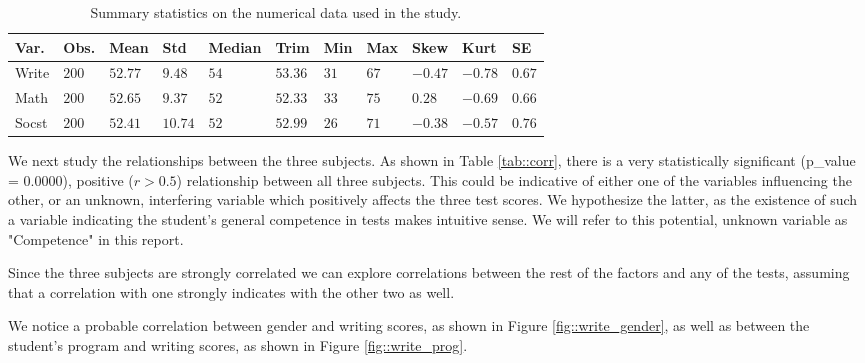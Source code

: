 \documentclass[10pt]{article}
\begin{document}
	\begin{table}
		\centering
		\begin{tabular}
			{ |p{1cm} p{0.5cm} p{0.7cm} p{0.5cm} p{1cm} p{0.7cm} p{0.5cm} p{0.5cm} p{0.5cm} p{0.5cm} p{0.5cm}| }
			\hline
			\textbf{Var.} & \textbf{Obs.} & \textbf{Mean} & \textbf{Std} & \textbf{Median} & \textbf{Trim} & \textbf{Min} & \textbf{Max} & \textbf{Skew} & \textbf{Kurt} & \textbf{SE}\\
			\hline
			Write & $200$ & $52.77$ & $9.48$ & $54$ & $53.36$ & $31$ & $67$ & $-0.47$ & $-0.78$ & $0.67$ \\
			Math & $200$ & $52.65$ & $9.37$ & $52$ & $52.33$ & $33$ & $75$ & $0.28$ & $-0.69$ & $0.66$ \\
			Socst & $200$ & $52.41$ & $10.74$ & $52$ &$ 52.99$ & $26$ & $71$ & $-0.38$ & $-0.57$ & $0.76$ \\
			\hline
		\end{tabular}
		\caption{Summary statistics on the numerical data used in the study.}
		\label{tab::summary_stats}
	\end{table}

	We next study the relationships between the three subjects. As shown in Table \ref{tab::corr}, there is a very statistically significant (p\_value = $0.0000$), positive ($r > 0.5$) relationship between all three subjects. This could be indicative of either one of the variables influencing the other, or an unknown, interfering variable which positively affects the three test scores. We hypothesize the latter, as the existence of such a variable indicating the student's general competence in tests makes intuitive sense. We will refer to this potential, unknown variable as "Competence" in this report.
	
	Since the three subjects are strongly correlated we can explore correlations between the rest of the factors and any of the tests, assuming that a correlation with one strongly indicates with the other two as well. 
	
	We notice a probable correlation between gender and writing scores, as shown in Figure \ref{fig::write_gender}, as well as between the student's program and writing scores, as shown in Figure \ref{fig::write_prog}.
	
\end{document}
